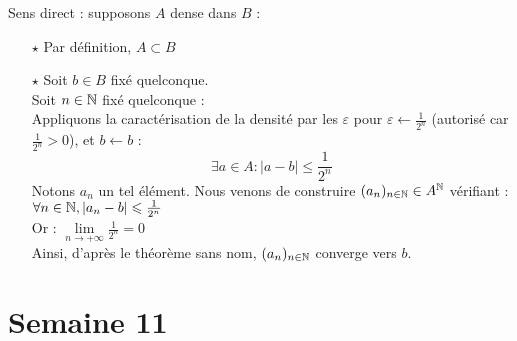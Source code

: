 \documentclass{article}
\renewenvironment{question_kholle}[2][ ]
{
	\subsection{\texorpdfstring{#2}{}}
	\notblank{#1}
	{
		\noindent #1
		\bigbreak
	}
	{}
	\begin{proof}
}
{
	\end{proof}
}
\begin{document}
\begin{question_kholle}
	Sens direct : supposons $A$
	dense dans $B$ : \\
	\begin{itemize}
		\item[$\star$] Par
		      définition, $A \subset B$
		\item[$\star$] Soit $b \in
			      B$ fixé quelconque. \\
		      Soit $n \in \mathbb N$ fixé
		      quelconque :  \\
		      Appliquons la
		      caractérisation de la
		      densité par les
		      $\varepsilon$ pour
		      $\varepsilon \leftarrow
			      \frac{1}{2^{n}}$
		      (autorisé car
		      $\frac{1}{2^{n}} > 0$),
		      et $b \leftarrow b$ :
		      $$\exists a \in A : |a -
			      b| \leqslant \frac{1}{2^{n}}$$
		      Notons $a_{n}$ un tel
		      élément. Nous venons de
		      construire $(a_{n})_{n
					      \in \mathbb N} \in A^{\mathbb N}$ vérifiant : \\
		      $\forall n \in \mathbb N, |a_n -
			      b| \leqslant \frac{1}{2^{n}}$ \\
		      Or : $\underset{n \to
				      +\infty}{\lim}
			      \frac{1}{2^{n}} = 0$ \\
		      Ainsi, d'après le
		      théorème sans nom,
		      $(a_{n})_{n \in \mathbb N}$
		      converge vers $b$.
	\end{itemize}
\end{question_kholle}
\pagebreak\section{Semaine 11}
\end{document}
